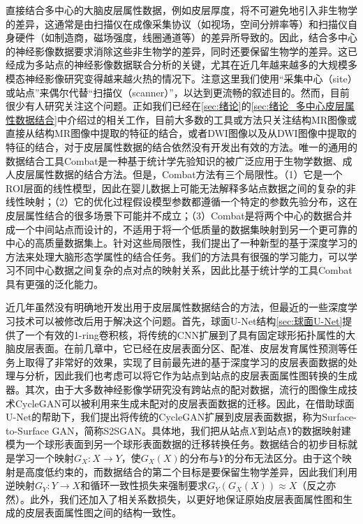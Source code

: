 直接结合多中心的大脑皮层属性数据，例如皮层厚度，将不可避免地引入非生物学的差异，这通常是由扫描仪在成像采集协议（如视场，空间分辨率等）和扫描仪自身硬件（如制造商，磁场强度，线圈通道等）的差异所导致的。因此，结合多中心的神经影像数据要求消除这些非生物学的差异，同时还要保留生物学的差异。这已经成为多站点的神经影像数据联合分析的关键，尤其在近几年越来越多的大规模多模态神经影像研究变得越来越火热的情况下。注意这里我们使用“采集中心（site）或站点”来偶尔代替“扫描仪（scanner）”，以达到更流畅的叙述目的。然而，目前很少有人研究关注这个问题。正如我们已经在\ref{sec:绪论}的\ref{sec:绪论_多中心皮层属性数据结合}中介绍过的相关工作，目前大多数的工具或方法只关注结构MR图像或直接从结构MR图像中提取的特征的结合\cite{pomponio2020harmonization}，或者DWI图像以及从DWI图像中提取的特征的结合\cite{karayumak2019retrospective}，对于皮层属性数据的结合依然没有开发出有效的方法。唯一的通用的数据结合工具Combat\cite{fortin2018harmonization}是一种基于统计学先验知识的被广泛应用于生物学数据、成人皮层属性数据的结合方法。但是，Combat方法有三个局限性。（1）它是一个ROI层面的线性模型，因此在婴儿数据上可能无法解释多站点数据之间的复杂的非线性映射；（2）它的优化过程假设模型参数都遵循一个特定的参数先验分布，这在皮层属性结合的很多场景下可能并不成立；（3）Combat是将两个中心的数据合并成一个中间站点而设计的，不适用于将一个低质量的数据集映射到另一个更可靠的中心的高质量数据集上。针对这些局限性，我们提出了一种新型的基于深度学习的方法来处理大脑形态学属性的结合任务。我们的方法具有很强的学习能力，可以学习不同中心数据之间复杂的点对点的映射关系，因此比基于统计学的工具Combat具有更强的泛化能力。

近几年虽然没有明确地开发出用于皮层属性数据结合的方法，但最近的一些深度学习技术\cite{zhao2019spherical_ipmi,zhu2017unpaired}可以被修改后用于解决这个问题。首先，球面U-Net结构\ref{sec:球面U-Net}提供了一个有效的1-ring卷积核，将传统的CNN扩展到了具有固定球形拓扑属性的大脑皮层表面。在前几章中，它已经在皮层表面分区、配准、皮层发育属性预测等任务上取得了非常好的效果，实现了目前最先进的基于深度学习的皮层表面数据的处理与分析，因此我们也考虑可以将它作为站点到站点的皮层表面属性图转换的生成器。其次，由于大多数神经影像学研究没有跨站点的配对数据，流行的图像生成技术CycleGAN\cite{zhu2017unpaired}可以被利用来生成未配对的皮层表面数据的迁移。因此，在借助球面U-Net的帮助下，我们提出将传统的CycleGAN扩展到皮层表面数据，称为Surface-to-Surface GAN，简称S2SGAN。具体地，我们把从站点$X$到站点$Y$的数据映射建模为一个球形表面到另一个球形表面数据的迁移转换任务。数据结合的初步目标就是学习一个映射$G_X:X\rightarrow Y$，使$G_X(X)$的分布与$Y$的分布无法区分。由于这个映射是高度低约束的，而数据结合的第二个目标是要保留生物学差异，因此我们利用逆映射$G_Y: Y\rightarrow X$和循环一致性损失来强制要求$G_Y(G_X(X))\approx X$（反之亦然）。此外，我们还加入了相关系数损失，以更好地保证原始皮层表面属性图和生成的皮层表面属性图之间的结构一致性。	
	

